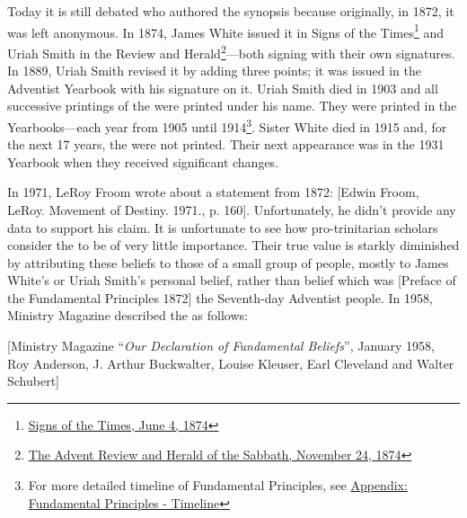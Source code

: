 Today it is still debated who authored the synopsis because originally, in 1872, it was left anonymous. In 1874, James White issued it in Signs of the Times\footnote{\href{https://adventistdigitallibrary.org/adl-364148/signs-times-june-4-1874}{Signs of the Times, June 4, 1874}} and Uriah Smith in the Review and Herald\footnote{\href{http://documents.adventistarchives.org/Periodicals/RH/RH18741124-V44-22.pdf}{The Advent Review and Herald of the Sabbath, November 24, 1874}}—both signing with their own signatures. In 1889, Uriah Smith revised it by adding three points; it was issued in the Adventist Yearbook with his signature on it. Uriah Smith died in 1903 and all successive printings of the  were printed under his name. They were printed in the Yearbooks—each year from 1905 until 1914\footnote{For more detailed timeline of Fundamental Principles, see \hyperref[appendix:timeline]{Appendix: Fundamental Principles - Timeline}}. Sister White died in 1915 and, for the next 17 years, the  were not printed. Their next appearance was in the 1931 Yearbook when they received significant changes.

In 1971, LeRoy Froom wrote about a statement from 1872: [Edwin Froom, LeRoy. Movement of Destiny. 1971., p. 160]. Unfortunately, he didn’t provide any data to support his claim. It is unfortunate to see how pro-trinitarian scholars consider the  to be of very little importance. Their true value is starkly diminished by attributing these beliefs to those of a small group of people, mostly to James White’s or Uriah Smith’s personal belief, rather than belief which was [Preface of the Fundamental Principles 1872] the Seventh-day Adventist people. In 1958, Ministry Magazine described the  as follows:

[Ministry Magazine “\textit{Our Declaration of Fundamental Beliefs}”, January 1958, Roy Anderson, J. Arthur Buckwalter, Louise Kleuser, Earl Cleveland and Walter Schubert]

